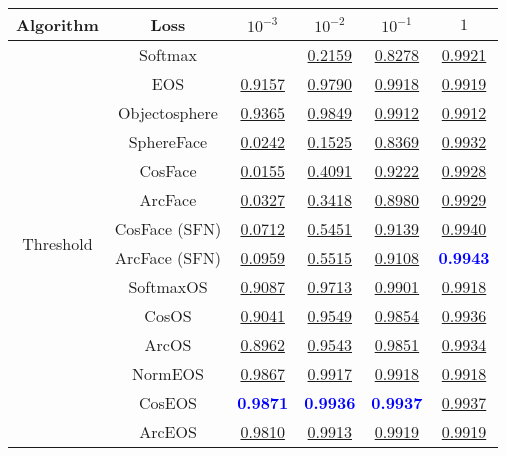\begin{table}[t]
\centering
\begin{tabularx}{.7\textwidth}{c|c|cccc}
\bf Algorithm & \bf Loss & $10^{-3}$ & $10^{-2}$ & $10^{-1}$ & $1$\\\hline\hline
\multirow{14}{*}{Threshold} & Softmax & & \underline{0.2159} & \underline{0.8278} & \underline{0.9921}\\
 & EOS & \underline{0.9157} & \underline{0.9790} & \underline{0.9918} & \underline{0.9919}\\
 & Objectosphere & \underline{0.9365} & \underline{0.9849} & \underline{0.9912} & \underline{0.9912}\\
 & SphereFace & \underline{0.0242} & \underline{0.1525} & \underline{0.8369} & \underline{0.9932}\\
 & CosFace & \underline{0.0155} & \underline{0.4091} & \underline{0.9222} & \underline{0.9928}\\
 & ArcFace & \underline{0.0327} & \underline{0.3418} & \underline{0.8980} & \underline{0.9929}\\
 & CosFace (SFN) & \underline{0.0712} & \underline{0.5451} & \underline{0.9139} & \underline{0.9940}\\
 & ArcFace (SFN) & \underline{0.0959} & \underline{0.5515} & \underline{0.9108} & \textcolor{blue}{\bf 0.9943}\\
 & SoftmaxOS & \underline{0.9087} & \underline{0.9713} & \underline{0.9901} & \underline{0.9918}\\
 & CosOS & \underline{0.9041} & \underline{0.9549} & \underline{0.9854} & \underline{0.9936}\\
 & ArcOS & \underline{0.8962} & \underline{0.9543} & \underline{0.9851} & \underline{0.9934}\\
 & NormEOS & \underline{0.9867} & \underline{0.9917} & \underline{0.9918} & \underline{0.9918}\\
 & CosEOS & \textcolor{blue}{\bf 0.9871} & \textcolor{blue}{\bf 0.9936} & \textcolor{blue}{\bf 0.9937} & \underline{0.9937}\\
 & ArcEOS & \underline{0.9810} & \underline{0.9913} & \underline{0.9919} & \underline{0.9919}\\
\hline
\end{tabularx}
\end{table}